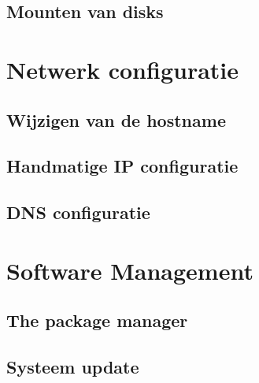 \documentclass[a4paper,12pt,twoside,openright,titlepage]{book}
\begin{document}
\section{Mounten van disks}


\chapter{Netwerk configuratie}

\section{Wijzigen van de hostname}

\section{Handmatige IP configuratie}





\section{DNS configuratie}

%

\chapter{Software Management}

\section{The package manager}

\section{Systeem update}

\end{document}
